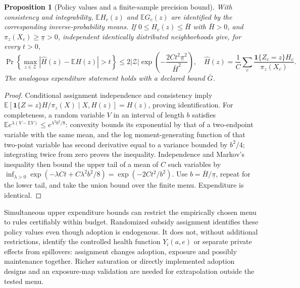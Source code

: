 \documentclass[11pt]{article}
\newtheorem{proposition}[theorem]{Proposition}
\newcommand{\E}{\mathbb E}
\newcommand{\Ind}{\mathbf 1}
\begin{document}
\begin{proposition}[Policy values and a finite-sample precision bound]
With consistency and integrability, $\E H_c(z)$ and $\E G_c(z)$ are
identified by the corresponding inverse-probability means. If
$0\leq H_c(z)\leq\bar H$ with $\bar H>0$, and
$\pi_z(X_c)\geq\underline\pi>0$,
independent identically distributed neighborhoods give, for every $t>0$,
\[
 \Pr\left\{\max_{z\in\mathcal Z}|\widehat H(z)-\E H(z)|>t\right\}
 \leq 2|\mathcal Z|\exp\left(-\frac{2C t^2\underline\pi^2}{\bar H^2}\right),
 \quad
 \widehat H(z)=\frac1C\sum_c\frac{\Ind\{Z_c=z\}H_c}{\pi_z(X_c)}.
                                                               \tag{5}
\]
The analogous expenditure statement holds with a declared bound $\bar G$.
\end{proposition}
\begin{proof}
Conditional assignment independence and consistency imply
$\E[\Ind\{Z=z\}H/\pi_z(X)\mid X,H(z)]=H(z)$, proving identification.
For completeness, a random variable $V$ in an interval of length $b$
satisfies $\E e^{\lambda(V-\E V)}\leq e^{\lambda^2b^2/8}$:
convexity bounds its exponential by that of a two-endpoint variable with
the same mean, and the log moment-generating function of that two-point
variable has second derivative equal to a variance bounded by $b^2/4$;
integrating twice from zero proves the inequality. Independence and
Markov's inequality then bound the upper tail of a mean of $C$ such
variables by $\inf_{\lambda>0}\exp(-\lambda Ct+C\lambda^2b^2/8)
=\exp(-2Ct^2/b^2)$. Use $b=\bar H/\underline\pi$, repeat for the lower
tail, and take the union bound over the finite menu. Expenditure is identical.
\end{proof}

Simultaneous upper expenditure bounds can restrict the empirically chosen
menu to rules certifiably within budget. Randomized subsidy assignment
identifies these policy values even though adoption is endogenous. It does
not, without additional restrictions, identify the controlled health
function $Y_i(a,e)$ or separate private effects from spillovers: assignment
changes adoption, exposure and possibly maintenance together. Richer
saturation or directly implemented adoption designs and an exposure-map
validation are needed for extrapolation outside the tested menu.
\end{document}
